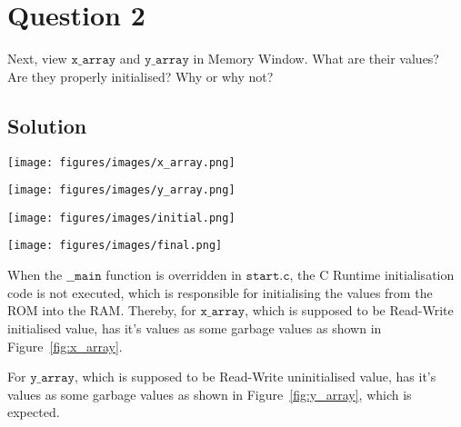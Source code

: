 \section*{Question 2}

Next, view \(\texttt{x\_array}\) and \(\texttt{y\_array}\) in Memory Window.
What are their values?\\
Are they properly initialised?
Why or why not?

\subsection*{Solution}

\begin{figure*}[htbp]
    \centering
    \texttt{[image: figures/images/x\_array.png]}
    \caption{
        Memory Window for \texttt{x\_array}.
    }\label{fig:x_array}
\end{figure*}

\begin{figure*}[htbp]
    \centering
    \texttt{[image: figures/images/y\_array.png]}
    \caption{
        Memory Window for \texttt{y\_array}.
    }\label{fig:y_array}
\end{figure*}

\begin{figure*}[htbp]
    \centering
    \texttt{[image: figures/images/initial.png]}
    \caption{
        Watch window for actual board was connected.
    }\label{fig:initial}
\end{figure*}

\begin{figure*}[htbp]
    \centering
    \texttt{[image: figures/images/final.png]}
    \caption{
        Watch window while using Simulator.
    }\label{fig:final}
\end{figure*}

When the \( \texttt{\_\_main} \) function is overridden in \( \texttt{start.c} \), the C Runtime initialisation code is not executed, which is responsible for initialising the values from the ROM into the RAM.\@
Thereby, for \( \texttt{x\_array} \), which is supposed to be Read-Write initialised value, has it's values as some garbage values as shown in Figure~\ref{fig:x_array}.

For \( \texttt{y\_array} \), which is supposed to be Read-Write uninitialised value, has it's values as some garbage values as shown in Figure~\ref{fig:y_array}, which is expected.

